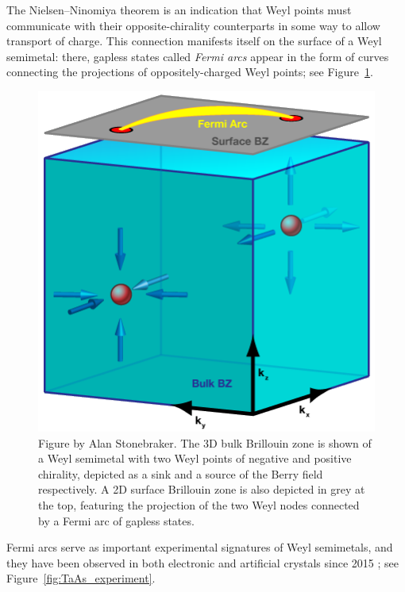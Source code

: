 The Nielsen--Ninomiya theorem is an indication that Weyl points must communicate with their opposite-chirality counterparts in some way to allow transport of charge. This connection manifests itself on the surface of a Weyl semimetal: there, gapless states called \emph{Fermi arcs} appear in the form of curves connecting the projections of oppositely-charged Weyl points; see Figure~\ref{fig:WSM_bulk+arc}.
\begin{figure}[htb!]
	\centering
	\includegraphics[width=.5\linewidth]{Images/WSM_bulk+arc}
	\caption{Figure by Alan Stonebraker. The 3D bulk Brillouin zone is shown of a Weyl semimetal with two Weyl points of negative and positive chirality, depicted as a sink and a source of the Berry field respectively. A 2D surface Brillouin zone is also depicted in grey at the top, featuring the projection of the two Weyl nodes connected by a Fermi arc of gapless states.}
	\label{fig:WSM_bulk+arc}
\end{figure}
Fermi arcs serve as important experimental signatures of Weyl semimetals, and they have been observed in both electronic and artificial crystals since 2015  \cite{Weng_WSM-candidates,Huang_WSM-candidates,Lv_WSM-TaAs,Xu_WSM-experiment,Belopolski_minimal-WSM,Liu_photonic-Chern-vector}; see Figure~\ref{fig:TaAs_experiment}.
